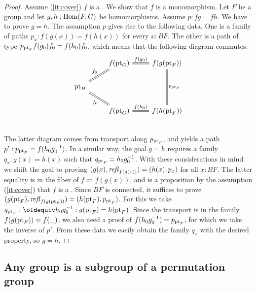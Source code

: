\begin{proof}
Assume (\ref{it:cover}) $f$ is a \covering. We show that $f$ is a monomorphism.
Let $F$ be a group and let $g,h : \mathrm{Hom}(F,G)$ be homomorphisms.
Assume $p: fg=fh$. We have to prove $g=h$. The assumption $p$
gives rise to the following data. One is a family of paths $p_x : f(g(x)) = f(h(x))$
for every $x:BF$. The other is a path of type $p_{\mathrm{pt}_F} f(g_0) f_0 = f(h_0) f_0$,
which means that the following diagram commutes.
\[
\begin{tikzcd} 
           &f(\pt_G) \arrow[r, equal, "f(g_0)"] & f(g(\pt_F)) \arrow[dd, equal, "p_{\pt_F}"]\\
\pt_H \arrow[ur, equal, "f_0"] \arrow[dr, equal, "f_0"']\\
           &f(\pt_G) \arrow[r, equal, "f(h_0)"]& f(h(\pt_F))\\
\end{tikzcd}
\]
The latter diagram comes from transport along $p_{\mathrm{pt}_F}$,
and yields a path $p': p_{\mathrm{pt}_F} = f(h_0 g_0^{-1})$.
In a similar way, the goal $g=h$ requires a family $q_x : g(x) = h(x)$
such that $q_{\mathrm{pt}_F} = h_0 g_0^{-1}$. With these considerations in mind
we shift the goal to proving $(g(x),\mathop{\mathit{refl}_{f(g(x))}})=(h(x),p_x)$ for all $x:BF$.
The latter equality is in the fiber of $f$ at $f(g(x))$, and is a proposition
by the assumption (\ref{it:cover}) that $f$ is a \covering. Since $BF$ is connected, 
it suffices to prove $(g(\mathrm{pt}_F),\mathop{\mathit{refl}_{f(g(\mathrm{pt}_F))}})=(h(\mathrm{pt}_F),p_{\mathrm{pt}_F})$.
For this we take $q_{\pt_F} \defeq h_0 g_0^{-1}: g(\pt_F) = h(\pt_F)$. 
Since the transport is in the family $f(g(\mathrm{pt}_F))=f(\_)$,
we also need a proof of $f(h_0 g_0^{-1}) = p_{\mathrm{pt}_F}$, 
for which we take the inverse of $p'$. From these data we easily obtain
the family $q_x$ with the desired property, so $g=h$.
\end{proof}



\subsection{Any group is a subgroup of a permutation group}
\label{sec:groupssubperm}


